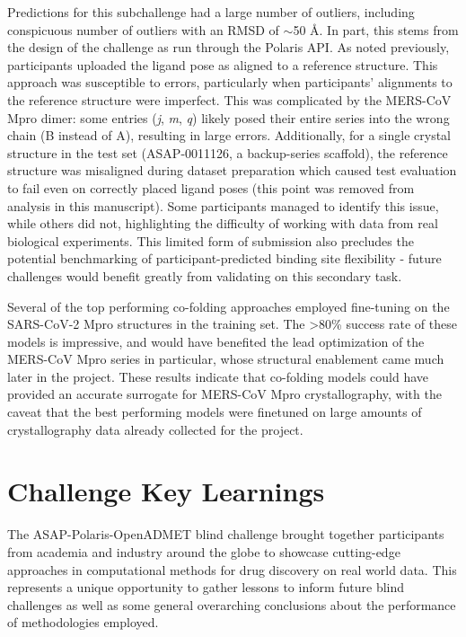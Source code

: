 \documentclass[journal=jcim,manuscript=article]{achemso}
\begin{document}
Predictions for this subchallenge had a large number of outliers, including conspicuous number of outliers with an RMSD of $\sim$50 Å. In part, this stems from the design of the challenge as run through the Polaris API. As noted previously, participants uploaded the ligand pose as aligned to a reference structure. This approach was susceptible to errors, particularly when participants’ alignments to the reference structure were imperfect. This was complicated by the MERS-CoV Mpro dimer: some entries (\textit{j}, \textit{m}, \textit{q}) likely posed their entire series into the wrong chain (B instead of A), resulting in large errors. Additionally, for a single crystal structure in the test set (ASAP-0011126, a backup-series scaffold), the reference structure was misaligned during dataset preparation which caused test evaluation to fail even on correctly placed ligand poses (this point was removed from analysis in this manuscript). Some participants managed to identify this issue, while others did not, highlighting the difficulty of working with data from real biological experiments. This limited form of submission also precludes the potential benchmarking of participant-predicted binding site flexibility - future challenges would benefit greatly from validating on this secondary task.

Several of the top performing co-folding approaches employed fine-tuning on the SARS-CoV-2 Mpro structures in the training set. The \textgreater 80\% success rate of these models is impressive, and would have benefited the lead optimization of the MERS-CoV Mpro series in particular, whose structural enablement came much later in the project. These results indicate that co-folding models could have provided an accurate surrogate for MERS-CoV Mpro crystallography, with the caveat that the best performing models were finetuned on large amounts of crystallography data already collected for the project.

\section{Challenge Key Learnings}

The ASAP-Polaris-OpenADMET blind challenge brought together participants from academia and industry around the globe to showcase cutting-edge approaches in computational methods for drug discovery on real world data. This represents a unique opportunity to gather lessons to inform future blind challenges as well as some general overarching conclusions about the performance of methodologies employed.
\end{document}
